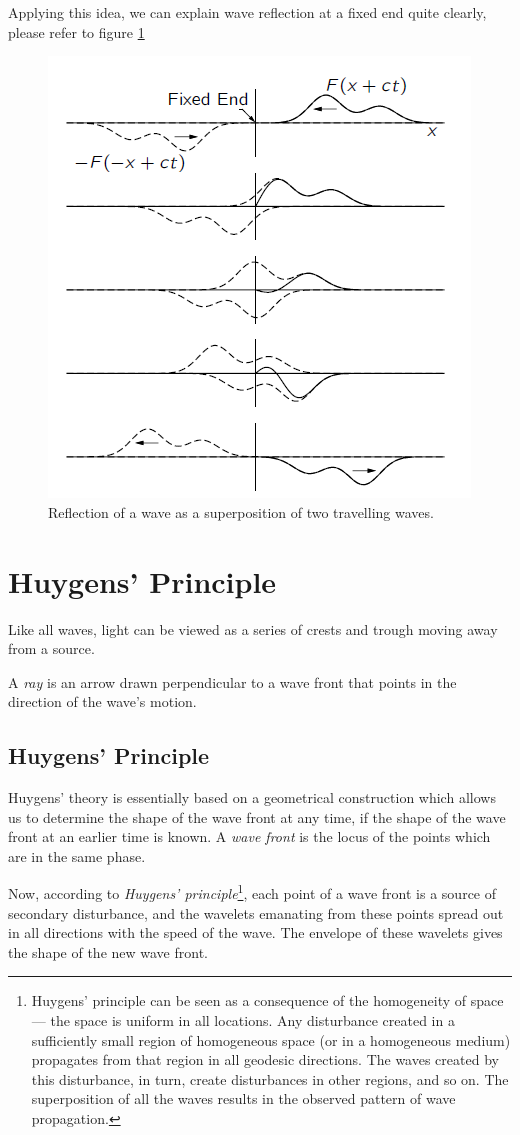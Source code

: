 \documentclass[openany]{book}
\begin{document}
Applying this idea, we can explain wave reflection at a fixed end quite clearly, please refer to figure \ref{fig:6}
\begin{figure}[H]
\centering
\includegraphics[scale=1]{Figure/6.PNG}
\caption{Reflection of a wave as a superposition of two travelling waves.}
\label{fig:6}
\end{figure}
\section{Huygens' Principle}
Like all waves, light can be viewed as a series of crests and trough moving away from a source.

A \emph{ray} is an arrow drawn perpendicular to a wave front that points in the direction of the wave’s motion.
\subsection{Huygens' Principle}
Huygens' theory is essentially based on a geometrical construction which allows us to determine the shape of the wave front at any time, if the shape of the wave front at an earlier time is known. A \emph{wave front} is the locus of the points which are in the same phase.

Now, according to \emph{Huygens' principle}\footnote{Huygens' principle can be seen as a consequence of the homogeneity of space — the space is uniform in all locations. Any disturbance created in a sufficiently small region of homogeneous space (or in a homogeneous medium) propagates from that region in all geodesic directions. The waves created by this disturbance, in turn, create disturbances in other regions, and so on. The superposition of all the waves results in the observed pattern of wave propagation.}, each point of a wave front is a source of secondary disturbance, and the wavelets emanating from these points spread out in all directions with the speed of the wave. The envelope of these wavelets gives the shape of the new wave front.
\end{document}
